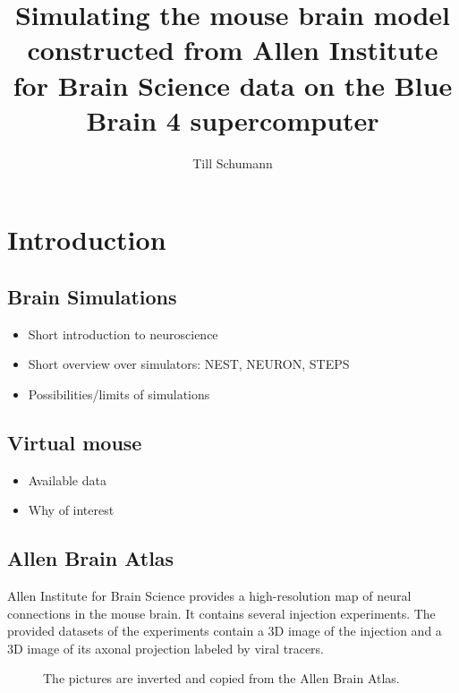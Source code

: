 \documentclass[a4paper]{article}
\title{ Simulating the mouse brain model constructed from Allen Institute for Brain Science data on the Blue Brain 4 supercomputer }
\author{Till Schumann}
\begin{document}
   \maketitle

\section{Introduction}
\subsection{Brain Simulations}
	\begin{itemize}
      \item Short introduction to neuroscience 
      \item Short overview over simulators: NEST, NEURON, STEPS
      \item Possibilities/limits of simulations
   \end{itemize}
   
\subsection{Virtual mouse}
	\begin{itemize}
      \item Available data
      \item Why of interest
   	\end{itemize}   

\subsection{Allen Brain Atlas}
   Allen Institute for Brain Science provides a high-resolution map of neural connections in the mouse brain.
   It contains several injection experiments. The provided datasets of the experiments 
   contain a 3D image of the injection and a 3D image of its axonal projection labeled by viral
   tracers.
   
   \begin{figure}[ht!]
   	\begin{center}
        \hspace{1cm}
    	   \end{center}
    	\caption{%
        The pictures are inverted and copied from the Allen Brain Atlas.
     }%
   \label{fig:atlas}
   \end{figure}
   
\end{document}
